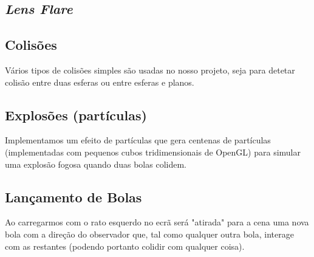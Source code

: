 \documentclass[12pt]{article}
\begin{document}
\subsection*{\textit{Lens Flare}}
\subsection*{Colisões}
Vários tipos de colisões simples são usadas no nosso projeto, seja para detetar colisão entre duas esferas ou entre esferas e planos.

\subsection*{Explosões (partículas)}
Implementamos um efeito de partículas que gera centenas de partículas (implementadas com pequenos cubos tridimensionais de OpenGL) para simular uma explosão fogosa quando duas bolas colidem.

\subsection*{Lançamento de Bolas}
Ao carregarmos com o rato esquerdo no ecrã será "atirada" para a cena uma nova bola com a direção
do observador que, tal como qualquer outra bola, interage com as restantes (podendo portanto colidir com qualquer coisa).
\end{document}
